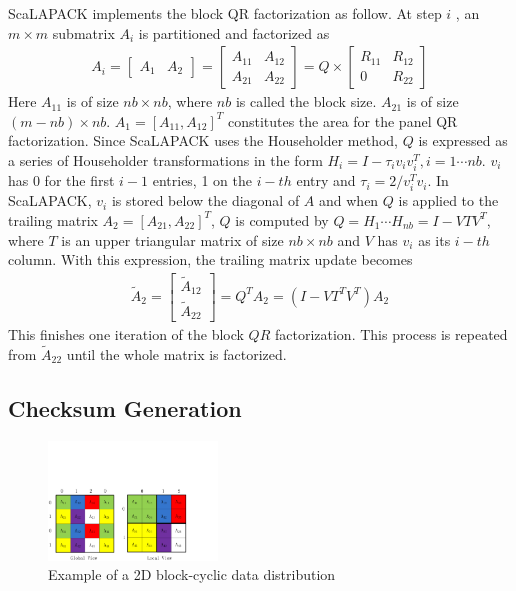 ScaLAPACK implements the block QR factorization as follow. At 
step $i$ , an $m\times m$ submatrix $A_{i}$ is partitioned and
factorized as
\begin{eqnarray*}
A_{i}=\begin{bmatrix}
A_{1} & A_{2}
\end{bmatrix}=\begin{bmatrix}
A_{11} & A_{12}\\ 
A_{21} & A_{22}
\end{bmatrix}
=Q\times \begin{bmatrix}
R_{11} & R_{12}\\ 
0 & R_{22}
\end{bmatrix}
\end{eqnarray*}
Here $A_{11}$ is of size $nb\times nb$, where $nb$ is called the block
size. $A_{21}$ is of size $(m-nb)\times nb$. $A_{1} = [A_{11}, A_{12}]^{T}$
constitutes the area for the panel QR factorization.  Since ScaLAPACK
uses the Householder method, $Q$ is expressed as a series of
Householder transformations in the form $H_{i} =
I-\tau_{i}v_{i}v_{i}^{T}, i=1\cdots nb$.  $v_{i}$ has 0 for the first
$i-1$ entries, 1 on the $i-th$ entry and
$\tau_{i}=2/v_{i}^{T}v_{i}$. In ScaLAPACK, $v_{i}$ is stored below the
diagonal of $A$ and when $Q$ is applied to the trailing matrix
$A_{2}=[A_{21}, A_{22}]^{T}$, $Q$ is computed by $Q=H_{1}\cdots
H_{nb}=I-VTV^{T}$, where $T$ is an upper triangular matrix of size
$nb\times nb$ and $V$ has $v_{i}$ as its $i-th$ column. With this
expression, the trailing matrix update becomes
\begin{eqnarray}
\label{eqn:qr-trailing}
\tilde{A}_{2}=\begin{bmatrix}
\tilde{A}_{12}\\ 
\tilde{A}_{22}
\end{bmatrix}= Q^{T}A_{2}=(I-VT^{T}V^{T})A_{2}
\end{eqnarray}
This finishes one iteration of the block $QR$ factorization. This
process is repeated from $\tilde{A}_{22}$ until the whole matrix is
factorized.

\subsection{Checksum Generation}

\begin{figure}[htb]
	\centering
	\includegraphics[totalheight=0.15\textheight, width=0.4\textwidth,viewport=1 1 690 360, clip]{figures/2d-block-cyclic}
	\caption{Example of a 2D block-cyclic data distribution}
	\label{fig:2d-block-cyclic}
\end{figure}

